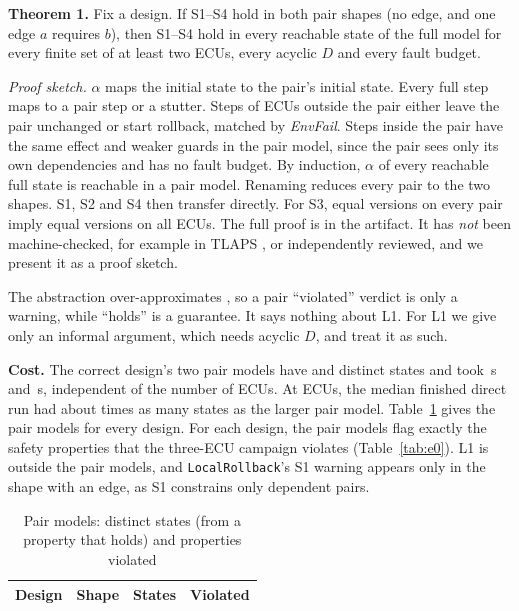 \documentclass[journal]{IEEEtran}
\begin{document}
\textbf{Theorem 1.} Fix a design. If S1--S4 hold in both pair shapes (no edge, and one edge $a$ requires $b$), then S1--S4 hold in every reachable state of the full model for every finite set of at least two ECUs, every acyclic $D$ and every fault budget.

\emph{Proof sketch.} $\alpha$ maps the initial state to the pair's initial state. Every full step maps to a pair step or a stutter. Steps of ECUs outside the pair either leave the pair unchanged or start rollback, matched by \emph{EnvFail}. Steps inside the pair have the same effect and weaker guards in the pair model, since the pair sees only its own dependencies and has no fault budget. By induction, $\alpha$ of every reachable full state is reachable in a pair model. Renaming reduces every pair to the two shapes. S1, S2 and S4 then transfer directly. For S3, equal versions on every pair imply equal versions on all ECUs. The full proof is in the artifact. It has \emph{not} been machine-checked, for example in TLAPS \cite{cousineau2012}, or independently reviewed, and we present it as a proof sketch.

The abstraction over-approximates \cite{clarke1994}, so a pair ``violated'' verdict is only a warning, while ``holds'' is a guarantee. It says nothing about L1. For L1 we give only an informal argument, which needs acyclic $D$, and treat it as such.

\textbf{Cost.} The correct design's two pair models have \PairStatesNone{} and \PairStatesEdge{} distinct states and took \PairSecondsNone\,s and \PairSecondsEdge\,s, independent of the number of ECUs. At \ScaleFirstStop{} ECUs, the median finished direct run had about \PairRatioAtStop{} times as many states as the larger pair model. Table~\ref{tab:pair} gives the pair models for every design. For each design, the pair models flag exactly the safety properties that the three-ECU campaign violates (Table~\ref{tab:e0}). L1 is outside the pair models, and \texttt{LocalRollback}'s S1 warning appears only in the shape with an edge, as S1 constrains only dependent pairs.

\begin{table}[t]
\caption{Pair models: distinct states (from a property that holds) and properties violated}
\label{tab:pair}
\centering
\footnotesize
\setlength{\tabcolsep}{4pt}
\begin{tabular}{@{}llrl@{}}
\toprule
Design & Shape & States & Violated \\
\midrule

\end{tabular}
\end{table}
\end{document}
